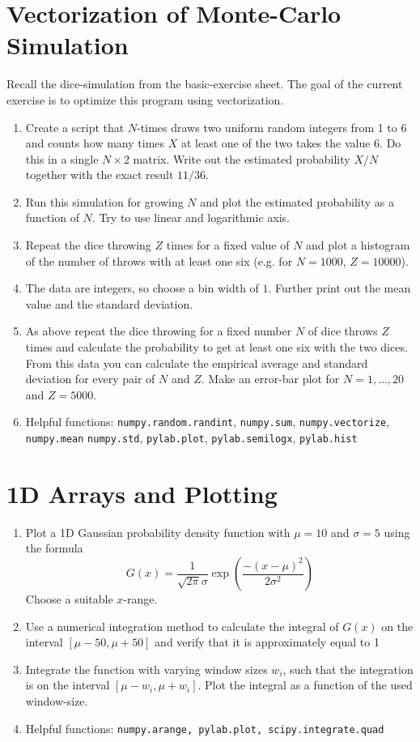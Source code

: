 \documentclass[smallheadings,12pt]{scrartcl}
\begin{document}
\section*{Vectorization of Monte-Carlo Simulation}
Recall the dice-simulation from the basic-exercise sheet. The goal of
the current exercise is to optimize this program using vectorization.
\begin{enumerate}
\item Create a script that $N$-times draws two uniform random integers
  from 1 to 6 and counts how many times $X$ at least one of the two takes
  the value 6. Do this
  in a single $N\times 2$ matrix.  Write out the estimated probability
  $X/N$ together with the exact result $11/36$.
\item Run this simulation for growing $N$ and plot the estimated probability as a
  function of $N$. Try to use linear and logarithmic axis.
\item Repeat the dice throwing $Z$ times for a fixed value of $N$ and
plot a histogram of the number of throws with at  least one six (e.g. for $N=1000$, $Z=10000$). 
\item The data are integers, so choose a bin width of $1$. Further print out the mean value and the standard deviation.
\item As above repeat the dice throwing for a fixed number $N$ of dice throws $Z$ times and calculate the probability 
to get at least one six with the two dices. From this data you can calculate the empirical average and standard 
deviation for every pair of $N$ and $Z$. Make an error-bar plot for $N=1,\ldots,20$ and $Z=5000$.

\item[] Helpful functions: {\tt numpy.random.randint}, {\tt numpy.sum}, {\tt numpy.vectorize}, {\tt numpy.mean}
{\tt numpy.std}, {\tt pylab.plot}, {\tt pylab.semilogx}, {\tt pylab.hist}
\end{enumerate}

\section*{1D Arrays and Plotting}
\begin{enumerate}
\item Plot a 1D Gaussian probability density function with $\mu=10$ and $\sigma=5$ using the formula
  \[
  G(x) = \frac{1}{\sqrt{2\pi}\sigma} \exp\left( \frac{-(x-\mu)^2}{2\sigma^2} \right)
  \]
  Choose a suitable $x$-range.

\item Use a numerical integration method to calculate the integral of
  $G(x)$ on the interval $[\mu-50,\mu+50]$ and verify that it is
  approximately equal to 1
\item Integrate the function with varying window sizes $w_i$, such that the
  integration is on the interval $[\mu-w_i, \mu+w_i]$. Plot the
  integral as a function of the used window-size.
\item[] Helpful functions: {\tt numpy.arange, pylab.plot, scipy.integrate.quad}
\end{enumerate}
\end{document}
